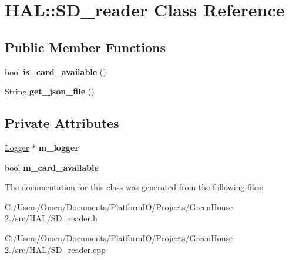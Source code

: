 \hypertarget{class_h_a_l_1_1_s_d__reader}{}\section{H\+AL\+:\+:S\+D\+\_\+reader Class Reference}
\label{class_h_a_l_1_1_s_d__reader}
\subsection*{Public Member Functions}
\begin{DoxyCompactItemize}
\item 
\mbox{\label{class_h_a_l_1_1_s_d__reader_a79ac121af6074d8871ff9fabec5892ee}} 
bool {\bfseries is\+\_\+card\+\_\+available} ()
\item 
\mbox{\label{class_h_a_l_1_1_s_d__reader_a2f41bdb3fef8f5240f1338b7cb1f0daa}} 
String {\bfseries get\+\_\+json\+\_\+file} ()
\end{DoxyCompactItemize}
\subsection*{Private Attributes}
\begin{DoxyCompactItemize}
\item 
\mbox{\label{class_h_a_l_1_1_s_d__reader_a660f8aa0443b98d3c41cfea8d72d7174}} 
\hyperlink{class_logger}{Logger} $\ast$ {\bfseries m\+\_\+logger}
\item 
\mbox{\label{class_h_a_l_1_1_s_d__reader_afd798df2c3a3645dc048798d0c0d032b}} 
bool {\bfseries m\+\_\+card\+\_\+available}
\end{DoxyCompactItemize}


The documentation for this class was generated from the following files\+:\begin{DoxyCompactItemize}
\item 
C\+:/\+Users/\+Omen/\+Documents/\+Platform\+I\+O/\+Projects/\+Green\+House 2./src/\+H\+A\+L/S\+D\+\_\+reader.\+h\item 
C\+:/\+Users/\+Omen/\+Documents/\+Platform\+I\+O/\+Projects/\+Green\+House 2./src/\+H\+A\+L/S\+D\+\_\+reader.\+cpp\end{DoxyCompactItemize}
